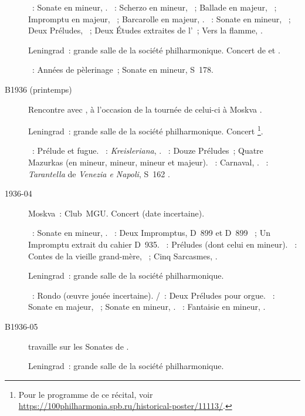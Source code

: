 \begin{description}
 \textsc{\Schumann{}}~: Sonate en \kF \Sharp mineur, .
 \textsc{\Chopin{}}~: Scherzo en \kB \Flat mineur, ~; Ballade en
 \kA \Flat majeur, ~; Impromptu en \kG \Flat majeur, ~;
 Barcarolle en \kF \Sharp majeur, .
 \textsc{\Scriabine{}}~: Sonate en \kF \Sharp mineur, ~; Deux
 Préludes, ~; Deux Études extraites de l'~; Vers la
 flamme, .
 \item[\DateWithWeekDay{1936-03-11}]
 Leningrad~: grande salle de la société philharmonique.
 Concert de \IBraudo{} et \VSofronitsky{}.

 \textsc{\Liszt{}}~: Années de pèlerinage~; Sonate en \kB mineur, S~178.
 \item[B1936 (printemps)]
 Rencontre avec \ACortot{}, à l'occasion de la tournée de celui-ci à Moskva
 \citep[p.~101]{Nikonovich08a}.
 \item[\DateWithWeekDay{1936-03-27}]
 Leningrad~: grande salle de la société philharmonique.
 Concert%
 \footnote{Pour le programme de ce récital, voir
 \href{https://100philharmonia.spb.ru/historical-poster/11113/}%
 {https://100philharmonia.spb.ru/historical-poster/11113/}.}.

 \textsc{\JBach{}}~: Prélude et fugue.
 \textsc{\Schumann{}}~: \emph{Kreisleriana}, .
 \textsc{\Chopin{}}~: Douze Préludes~; Quatre Mazurkas (en \kA mineur, \kA
 mineur, \kF mineur et \kC majeur).
 \textsc{\Schumann{}}~: Carnaval, .
 \textsc{\Liszt{}}~: \emph{Tarantella} de \emph{Venezia e Napoli}, S~162
 .
 \item[1936-04]
 Moskva~: Club~MGU.
 Concert (date incertaine).

 \textsc{\Beethoven{}}~: Sonate en \kF mineur, .
 \textsc{\Schubert{}}~: Deux Impromptus, D~899  et D~899
 ~; Un Impromptu extrait du cahier D~935.
 \textsc{\Chostakovitch{}}~: Préludes (dont celui en \kC \Sharp mineur).
 \textsc{\Prokofiev{}}~: Contes de la vieille grand-mère, ~; Cinq
 Sarcasmes, .
 \item[\DateWithWeekDay{1936-04-09}]
 Leningrad~: grande salle de la société philharmonique.

 \textsc{\CBach{}}~: Rondo (œuvre jouée incertaine).
 \textsc{\JBach{}/\Ziloti{}}~: Deux Préludes pour orgue.
 \textsc{\Beethoven{}}~: Sonate en \kD majeur,  ~; Sonate
 en \kC mineur, .
 \textsc{\Chopin{}}~: Fantaisie en \kF mineur, .
 \item[B1936-05]
 \VSofronitsky{} travaille sur les Sonates de \Beethoven{} .
 \item[\DateWithWeekDay{1936-05-25}]
 Leningrad~: grande salle de la société philharmonique.


\end{description}
